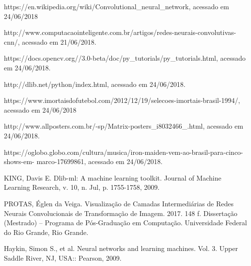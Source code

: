 \documentclass[conference]{IEEEtran}
\begin{document}
         
	  \begin{thebibliography}{00}

		 https://en.wikipedia.org/wiki/Convolutional\_neural\_network, acessado em 24/06/2018	  
	  		
		 http://www.computacaointeligente.com.br/artigos/redes-neurais-convolutivas-cnn/, acessado em 		        21/06/2018.
		
		 https://docs.opencv.org//3.0-beta/doc/py\_tutorials/py\_tutorials.html, acessado em 24/06/2018.
		
		 http://dlib.net/python/index.html, acessado em 24/06/2018.
		
		 https://www.imortaisdofutebol.com/2012/12/19/selecoes-imortais-brasil-1994/, acessado em                                                                   		24/06/2018
		
		 http://www.allposters.com.br/-sp/Matrix-posters\_i8032466\_.html, acessado em 24/06/2018.

		 https://oglobo.globo.com/cultura/musica/iron-maiden-vem-ao-brasil-para-cinco-shows-em-						marco-17699861, acessado em 24/06/2018.
		
		 KING, Davis E. Dlib-ml: A machine learning toolkit. Journal of Machine Learning Research, v. 10, 			n. Jul, p. 1755-1758, 2009.
		
		 PROTAS, Églen da Veiga. Visualização de Camadas Intermediárias de Redes Neurais
		Convolucionais de Transformação de Imagem. 2017. 148 f. Dissertação (Mestrado) –
		Programa de Pós-Graduação em Computação. Universidade Federal do Rio Grande, Rio
		Grande.
		
		 Haykin, Simon S., et al. Neural networks and learning machines. Vol. 3. Upper Saddle River, NJ, 			USA:: Pearson, 2009.
		
	  \end{thebibliography}
\end{document}
